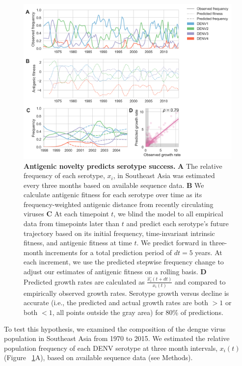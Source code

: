 \documentclass[11pt,oneside,letterpaper]{article}
\begin{document}
\begin{figure}[h]
  \begin{centering}
    \includegraphics[width=\linewidth]{../figures/png/serotype_fitness_model.png}
  	\caption{\textbf{Antigenic novelty predicts serotype success.}  \textbf{A} The relative frequency of each serotype, $x_i$, in Southeast Asia was estimated every three months based on available sequence data. \textbf{B} We calculate antigenic fitness for each serotype over time as its frequency-weighted antigenic distance from recently circulating viruses \textbf{C} At each timepoint $t$, we blind the model to all empirical data from timepoints later than $t$ and predict each serotype's future trajectory based on its initial frequency, time-invariant intrinsic fitness, and antigenic fitness at time $t$. We predict forward in three-month increments for a total prediction period of $dt = 5$ years. At each increment, we use the predicted stepwise frequency change to adjust our estimates of antigenic fitness on a rolling basis. \textbf{D} Predicted growth rates are calculated as $\frac{\hat{x_i}(t+dt)}{x_i(t)}$ and compared to empirically observed growth rates. Serotype growth versus decline is accurate (i.e., the predicted and actual growth rates are both $>1$ or both $<1$, all points outside the gray area) for 80\% of predictions.}
  	\label{serotype_fitness_model}
  \end{centering}
\end{figure}

To test this hypothesis, we examined the composition of the dengue virus population in Southeast Asia from 1970 to 2015.
We estimated the relative population frequency of each DENV serotype at three month intervals, $x_i(t)$ (Figure ~\ref{serotype_fitness_model}A), based on available sequence data (see Methods).
\end{document}
